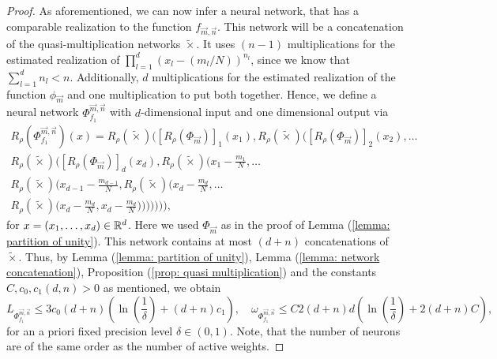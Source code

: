 \begin{proof}
    As aforementioned, we can now infer a neural network, that has a comparable realization to the
    function $f_{\vec{m},\vec{n}}$. This network will be a concatenation of the quasi-multiplication networks $\tilde{\times}$.
    It uses $(n - 1)$ multiplications for the estimated realization of $\prod_{l=1}^d (x_l - (m_l / N))^{n_l}$, since 
    we know that $\sum_{l=1}^d n_l < n$. Additionally,
    $d$ multiplications for the estimated realization
    of the function $\phi_{\vec{m}}$ and one multiplication to put both together. Hence, we define a neural
    network $\Phi^{\vec{m}, \vec{n}}_{f_1}$ with $d$-dimensional input and one dimensional output via
    \begin{multline*}
        R_\rho(\Phi^{\vec{m}, \vec{n}}_{f_1})(x) = R_\rho(\tilde{\times})\bigg( [R_\rho(\Phi_{\vec{m}})]_1(x_1), 
        R_\rho(\tilde{\times})\bigg([R_\rho(\Phi_{\vec{m}})]_2(x_2), \dots \\
        R_\rho(\tilde{\times}) \bigg([R_\rho(\Phi_{\vec{m}})]_d(x_d), R_\rho(\tilde{\times})
        \bigg(x_1 - \frac{m_1}{N}, \dots \\
        R_\rho(\tilde{\times}) \bigg( x_{d-1} - \frac{m_{d-1}}{N}, R_\rho(\tilde{\times})\bigg(
        x_d - \frac{m_d}{N}, \dots \\
        R_\rho(\tilde{\times}) \bigg(x_d - \frac{m_d}{N},  x_d - \frac{m_d}{N}\bigg)
        \bigg)\bigg)\bigg)\bigg) \bigg)\bigg),
    \end{multline*}
    for $x = (x_1, \dots, x_d) \in \mathbb{R}^d$. Here we used $\Phi_{\vec{m}}$ as in the proof of Lemma (\ref{lemma: partition of unity}).
    This network contains at most $(d + n)$ concatenations of $\tilde{\times}$.
    Thus, by Lemma (\ref{lemma: partition of unity}), Lemma (\ref{lemma: network concatenation}),
    Proposition (\ref{prop: quasi multiplication}) and the constants $C, c_0, c_1(d, n) > 0$ as mentioned, we obtain
    \begin{equation} \label{eq: yarotsky complexity with delta}
        L_{\Phi^{\vec{m}, \vec{n}}_{f_1}} \leq 3 c_0 (d + n) \left(\ln\left(\frac{1}{\delta}\right) + (d + n) c_1 \right), \quad
        \omega_{\Phi^{\vec{m}, \vec{n}}_{f_1}} \leq C 2(d + n) d \left(\ln\left(\frac{1}{\delta}\right) + 2(d + n) C \right),
    \end{equation}
    for an a priori fixed precision level $\delta \in (0, 1)$. Note, that the number of neurons are of the same order as 
    the number of active weights.


\end{proof}
